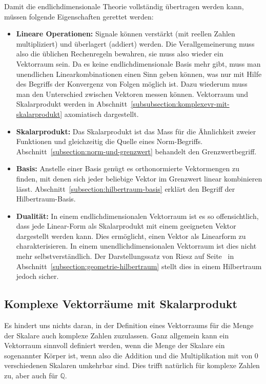 Damit die endlichdimensionale Theorie vollständig übertragen werden kann,
müssen folgende Eigenschaften gerettet werden:
\begin{itemize}
\item {\bf Lineare Operationen:}
Signale können verstärkt (mit reellen Zahlen multipliziert) und überlagert
(addiert) werden.
Die Verallgemeinerung muss also die üblichen Rechenregeln bewahren,
sie muss also wieder ein Vektorraum sein.
Da es keine endlichdimensionale Basis mehr gibt, muss man unendlichen
Linearkombinationen einen Sinn geben können, was nur mit Hilfe des
Begriffs der Konvergenz von Folgen möglich ist.
Dazu wiederum muss man den Unterschied zwischen Vektoren messen können.
Vektorraum und Skalarprodukt werden in
Abschnitt~\ref{subsubsection:komplexevr-mit-skalarprodukt}
axomiatisch dargestellt.
\item {\bf Skalarprodukt:}
Das Skalarprodukt ist das Mass für die Ähnlichkeit zweier Funktionen
und gleichzeitig die Quelle eines Norm-Begriffs.
Abschnitt~\ref{subsection:norm-und-grenzwert} behandelt den Grenzwertbegriff.
\item {\bf Basis:}
Anstelle einer Basis genügt es orthonormierte Vektormengen zu finden,
mit denen sich jeder beliebige Vektor im Grenzwert linear kombinieren
lässt.
Abschnitt~\ref{subsection:hilbertraum-basis} erklärt den Begriff der
Hilbertraum-Basis.
\item {\bf Dualität:}
In einem endlichdimensionalen Vektorraum ist es so offensichtlich, dass
jede Linear-Form als Skalarprodukt mit einem geeigneten Vektor 
dargestellt werden kann.
Dies ermöglicht, einen Vektor als Linearform zu charakterisieren.
In einem unendlichdimensionalen Vektorraum ist dies nicht mehr
selbstverständlich.
Der Darstellungssatz von Riesz auf Seite~\pageref{subsubsection:riesz}
in Abschnitt~\ref{subsection:geometrie-hilbertraum}
stellt dies in einem Hilbertraum jedoch sicher.
\end{itemize}

\subsection{Komplexe Vektorräume mit Skalarprodukt
\label{subsubsection:komplexevr-mit-skalarprodukt}}
Es hindert uns nichts daran, in der Definition eines Vektorraums für die
Menge der Skalare auch komplexe Zahlen zuzulassen.
Ganz allgemein kann ein Vektorraum sinnvoll definiert werden, wenn die Menge
der Skalare ein sogenannter Körper ist, wenn also die Addition
und die Multiplikation mit von $0$ verschiedenen Skalaren umkehrbar sind.
Dies trifft natürlich für komplexe Zahlen zu, aber auch für $\mathbb Q$.

